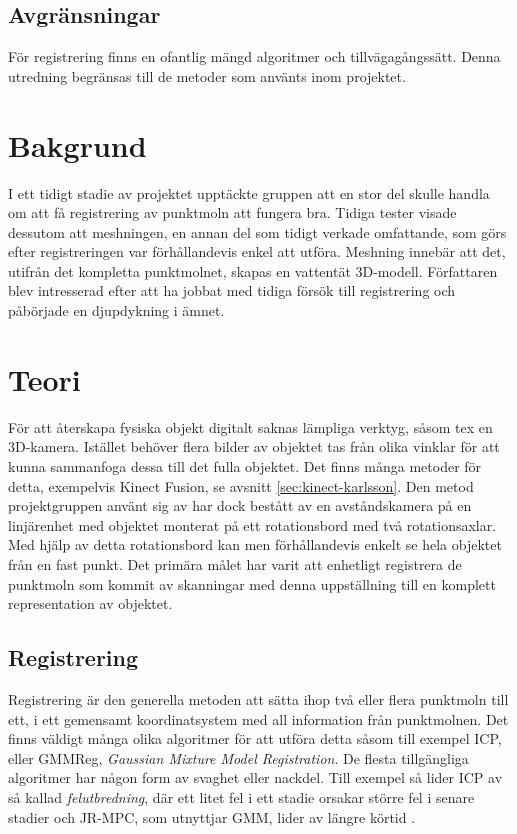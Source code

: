 \subsection{Avgränsningar}
\label{sec:limits-karlsson}
För registrering finns en ofantlig mängd algoritmer och tillvägagångssätt. Denna utredning begränsas till de metoder som använts inom projektet. 


\section{Bakgrund}
\label{sec:background-karlsson}
I ett tidigt stadie av projektet upptäckte gruppen att en stor del skulle handla om att få registrering av punktmoln att fungera bra. Tidiga tester visade dessutom att meshningen, en annan del som tidigt verkade omfattande, som görs efter registreringen var förhållandevis enkel att utföra. Meshning innebär att det, utifrån det kompletta punktmolnet, skapas en vattentät 3D-modell. Författaren blev intresserad efter att ha jobbat  med tidiga försök till registrering och påbörjade en djupdykning i ämnet.


\section{Teori}
\label{sec:theory-karlsson}

För att återskapa fysiska objekt digitalt saknas lämpliga verktyg, såsom tex en 3D-kamera. Istället behöver flera bilder av objektet tas från olika vinklar för att kunna sammanfoga dessa till det fulla objektet. Det finns många metoder för detta, exempelvis Kinect Fusion, se avsnitt \ref{sec:kinect-karlsson}. Den metod projektgruppen använt sig av har dock bestått av en avståndskamera på en linjärenhet med objektet monterat på ett rotationsbord med två rotationsaxlar. Med hjälp av detta rotationsbord kan men förhållandevis enkelt se hela objektet från en fast punkt. Det primära målet har varit att enhetligt registrera de punktmoln som kommit av skanningar med denna uppställning till en komplett representation av objektet.


\subsection{Registrering}
\label{sec:registrering-karlsson}

Registrering är den generella metoden att sätta ihop två eller flera punktmoln till ett, i ett gemensamt koordinatsystem med all information från punktmolnen. Det finns väldigt många olika algoritmer för att utföra detta såsom till exempel ICP, eller GMMReg, \textit{Gaussian Mixture Model Registration}. De flesta tillgängliga algoritmer har någon form av svaghet eller nackdel. Till exempel så lider ICP av så kallad \textit{felutbredning}, där ett litet fel i ett stadie orsakar större fel i senare stadier och JR-MPC, som utnyttjar GMM, lider av längre körtid \cite{Evangelidis-ECCV-2014}.

